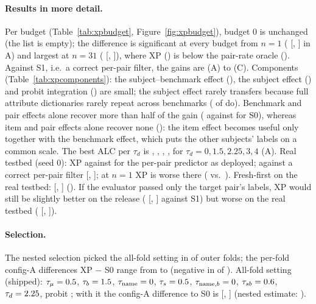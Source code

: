 \documentclass{article}
\begin{document}
\paragraph{Results in more detail.} Per budget (Table~\ref{tab:xpbudget}, Figure~\ref{fig:xpbudget}), budget 0 is unchanged (the list is empty); the difference is significant at every budget from $n=1$ (\XpCADiffSZeroBOneMean{} [\XpCADiffSZeroBOneLo, \XpCADiffSZeroBOneHi] in A) and largest at $n=31$ (\XpCADiffSZeroBThirtyOneMean{} [\XpCADiffSZeroBThirtyOneLo, \XpCADiffSZeroBThirtyOneHi]), where XP (\XpCAXpBThirtyOne) is below the pair-rate oracle (\XpCAOrBThirtyOne). Against S1, i.e.\ a correct per-pair filter, the gains are \XpCADiffSOneMean{} (A) to \XpCCDiffSOneMean{} (C). Components (Table~\ref{tab:xpcomponents}): the subject--benchmark effect (\XpCompAPairMean), the subject effect (\XpCompASubjMean) and probit integration (\XpCompAProbitMean) are small; the subject effect rarely transfers because full attribute dictionaries rarely repeat across benchmarks (\XpFrSubjMulti{} of \XpFrNSubjKeys{} do). Benchmark and pair effects alone recover more than half of the gain (\XpCompABenchPairAlc{} against \XpCASZeroAlc{} for S0), whereas item and pair effects alone recover none (\XpCompAPairItemAlc): the item effect becomes useful only together with the benchmark effect, which puts the other subjects' labels on a common scale. The best ALC per $\tau_d$ is \XpProfItemZeroA, \XpProfItemOneFiveA, \XpProfItemTwoTwoFiveA, \XpProfItemThreeA, \XpProfItemFourA{} for $\tau_d=0,1.5,2.25,3,4$ (A). Real testbed (seed 0): XP \XpRealXpAlc{} against \XpRealShipGlobalAlc{} for the per-pair predictor as deployed; against a correct per-pair filter \XpRealDiffPerPairMean{} [\XpRealDiffPerPairLo, \XpRealDiffPerPairHi]; at $n=1$ XP is worse there (\XpRealXpBOne{} vs.\ \XpRealShipGlobalBOne). Fresh-first on the real testbed: \XpRealAcqMean{} [\XpRealAcqLo, \XpRealAcqHi] (\XpRealAcqSig). If the evaluator passed only the target pair's labels, XP would still be slightly better on the release (\XpPerPairMean{} [\XpPerPairLo, \XpPerPairHi] against S1) but worse on the real testbed (\XpRealXpPerPairVsPerPairMean{} [\XpRealXpPerPairVsPerPairLo, \XpRealXpPerPairVsPerPairHi]).

\paragraph{Selection.} The nested selection picked the all-fold setting in \XpSelNFoldsSame{} of \XpSelNFolds{} outer folds; the per-fold config-A differences XP $-$ S0 range from \XpCAFoldMin{} to \XpCAFoldMax{} (negative in \XpCAFoldNNeg{} of \XpSelNFolds). All-fold setting (shipped): $\tau_\mu=0.5$, $\tau_b=1.5$, $\tau_{\mathrm{name}}=0$, $\tau_s=0.5$, $\tau_{\mathrm{name},b}=0$, $\tau_{sb}=0.6$, $\tau_d=2.25$, probit \XpProbit; with it the config-A difference to S0 is \XpCAAllfoldDiffMean{} [\XpCAAllfoldDiffLo, \XpCAAllfoldDiffHi] (nested estimate: \XpCADiffSZeroMean).
\end{document}
